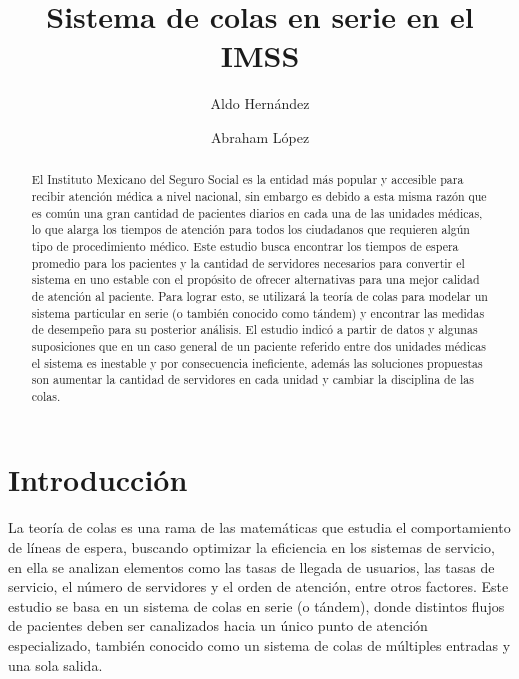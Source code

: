 \documentclass[10pt]{article}
\begin{document}
	\begin{opening}
		\title{Sistema de colas en serie en el IMSS}
		\author[Universidad Autónoma de Nuevo León, San Nicolás de los Garza, aldo.hernandezt@uanl.edu.mx]{Aldo Hernández}
		\author[Universidad Autónoma de Nuevo León, San Nicolás de los Garza, abraham.lopezg@uanl.edu.mx]{Abraham López}
		
		\begin{abstract}
            El Instituto Mexicano del Seguro Social es la entidad más popular y accesible para recibir atención médica a nivel nacional, sin embargo es debido a esta misma razón que es común una gran cantidad de pacientes diarios en cada una de las unidades médicas, lo que alarga los tiempos de atención para todos los ciudadanos que requieren algún tipo de procedimiento médico. Este estudio busca encontrar los tiempos de espera promedio para los pacientes y la cantidad de servidores necesarios para convertir el sistema en uno estable con el propósito de ofrecer alternativas para una mejor calidad de atención al paciente. Para lograr esto, se utilizará la teoría de colas para modelar un sistema particular en serie (o también conocido como tándem) y encontrar las medidas de desempeño para su posterior análisis. El estudio indicó a partir de datos y algunas suposiciones que en un caso general de un paciente referido entre dos unidades médicas el sistema es inestable y por consecuencia ineficiente, además las soluciones propuestas son aumentar la cantidad de servidores en cada unidad y cambiar la disciplina de las colas.
		\end{abstract}

	\end{opening}
	
	\section{Introducción}
	La teoría de colas es una rama de las matemáticas que estudia el comportamiento de líneas de espera, buscando optimizar la eficiencia en los sistemas de servicio, en ella se analizan elementos como las tasas de llegada de usuarios, las tasas de servicio, el número de servidores y el orden de atención, entre otros factores. Este estudio se basa en un sistema de colas en serie (o tándem), donde distintos flujos de pacientes deben ser canalizados hacia un único punto de atención especializado, también conocido como un sistema de colas de múltiples entradas y una sola salida.
	
\end{document}
